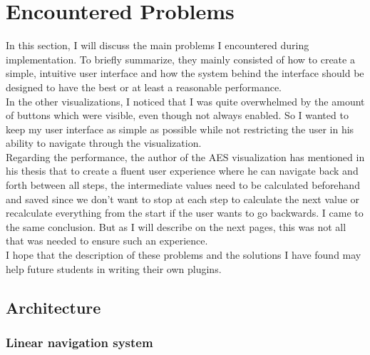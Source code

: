 
\section{Encountered Problems}
\label{sec:encounteredProblems}

In this section, I will discuss the main problems I encountered during implementation. To briefly summarize, they mainly consisted of how to create a simple, intuitive user interface and how the system behind the interface should be designed to have the best or at least a reasonable performance. \\
In the other visualizations, I noticed that I was quite overwhelmed by the amount of buttons which were visible, even though not always enabled. So I wanted to keep my user interface as simple as possible while not restricting the user in his ability to navigate through the visualization. \\
Regarding the performance, the author of the AES visualization has mentioned in his thesis that to create a fluent user experience where he can navigate back and forth between all steps, the intermediate values need to be calculated beforehand and saved since we don't want to stop at each step to calculate the next value or recalculate everything from the start if the user wants to go backwards. I came to the same conclusion. But as I will describe on the next pages, this was not all that was needed to ensure such an experience.\\
I hope that the description of these problems and the solutions I have found may help future students in writing their own plugins.

\subsection{Architecture}

\subsubsection{Linear navigation system}

